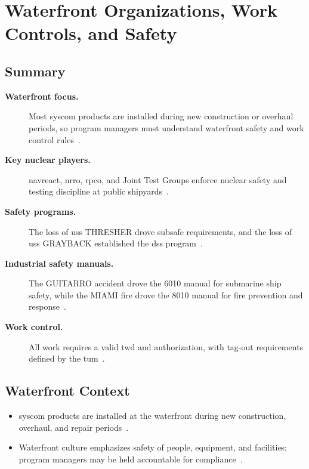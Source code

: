 \documentclass[../main.tex]{subfiles}
\begin{document}
\section{Waterfront Organizations, Work Controls, and Safety}

\subsection{Summary}
\begin{description}
  \item[\textbf{Waterfront focus.}] Most \ac{syscom} products are installed during new construction or overhaul periods, so program managers must understand waterfront safety and work control rules~\autocite{edo-4-1-5-waterfront-work-control-2025}.
  \item[\textbf{Key nuclear players.}] \ac{navreact}, \ac{nrro}, \ac{rpco}, and Joint Test Groups enforce nuclear safety and testing discipline at public shipyards~\autocite{edo-4-1-5-waterfront-work-control-2025}.
  \item[\textbf{Safety programs.}] The loss of \ac{uss} THRESHER drove \ac{subsafe} requirements, and the loss of \ac{uss} GRAYBACK established the \ac{dss} program~\autocite{edo-4-1-5-waterfront-work-control-2025}.
  \item[\textbf{Industrial safety manuals.}] The GUITARRO accident drove the 6010 manual for submarine ship safety, while the MIAMI fire drove the 8010 manual for fire prevention and response~\autocite{edo-4-1-5-waterfront-work-control-2025,S9002-AK-CCM-010-6010,S0570-AC-CCM-010-8010}.
  \item[\textbf{Work control.}] All work requires a valid \ac{twd} and authorization, with tag-out requirements defined by the \ac{tum}~\autocite{edo-4-1-5-waterfront-work-control-2025,S0400-AD-URM-010}.
\end{description}

\subsection{Waterfront Context}
\begin{itemize}
  \item \ac{syscom} products are installed at the waterfront during new construction, overhaul, and repair periods~\autocite{edo-4-1-5-waterfront-work-control-2025}.
  \item Waterfront culture emphasizes safety of people, equipment, and facilities; program managers may be held accountable for compliance~\autocite{edo-4-1-5-waterfront-work-control-2025}.
\end{itemize}
\end{document}
